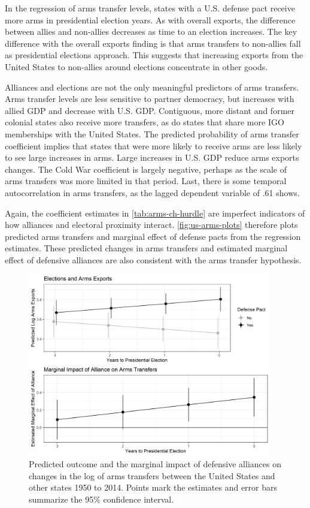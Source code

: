 \documentclass[12pt]{article}
\begin{document}
In the regression of arms transfer levels, states with a U.S. defense pact receive more arms in presidential election years. 
As with overall exports, the difference between allies and non-allies decreases as time to an election increases.
The key difference with the overall exports finding is that arms transfers to non-allies fall as presidential elections approach. 
This suggests that increasing exports from the United States to non-allies around elections concentrate in other goods. 


Alliances and elections are not the only meaningful predictors of arms transfers.
Arms transfer levels are less sensitive to partner democracy, but increases with allied GDP and decrease with U.S. GDP. 
Contiguous, more distant and former colonial states also receive more transfers, as do states that share more IGO memberships with the United States.
The predicted probability of arms transfer coefficient implies that states that were more likely to receive arms are less likely to see large increases in arms. 
Large increases in U.S. GDP reduce arms exports changes. 
The Cold War coefficient is largely negative, perhaps as the scale of arms transfers was more limited in that period. 
Last, there is some temporal autocorrelation in arms transfers, as the lagged dependent variable of .61 shows.


Again, the coefficient estimates in \autoref{tab:arms-ch-hurdle} are imperfect indicators of how alliances and electoral proximity interact.
\autoref{fig:us-arms-plots} therefore plots predicted arms transfers and marginal effect of defense pacts from the regression estimates.
These predicted changes in arms transfers and estimated marginal effect of defensive alliances are also consistent with the arms transfer hypothesis.


\begin{figure}[htpb]
	\centering
		\includegraphics[width=0.95\textwidth]{../figures/us-arms-plots.png}
	\caption{Predicted outcome and the marginal impact of defensive alliances on changes in the log of arms transfers between the United States and other states 1950 to 2014. Points mark the estimates and error bars summarize the 95\% confidence interval.}
	\label{fig:us-arms-plots}
\end{figure}
\end{document}
